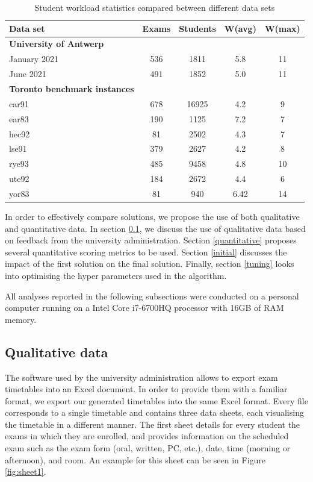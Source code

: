 \begin{table}[H]
	\caption{Student workload statistics compared between different data sets}
	\label{tab:workload_compared}
	\centering
	\begin{tabular}{l c c c c}
		\hline
		\textbf{Data set}& \textbf{Exams} & \textbf{Students} & \textbf{W(avg)} & \textbf{W(max)} \\ \hline
            \textbf{University of Antwerp} \\  \hline
		January 2021  & 536 & 1811 & 5.8 & 11 \\
		June 2021 & 491 & 1852 & 5.0 & 11 \\ \hline
              \textbf{Toronto benchmark instances} \\  \hline
		car91  & 678 & 16925 & 4.2 & 9 \\
		ear83 & 190 & 1125 & 7.2 & 7 \\
            hec92 & 81 & 2502 & 4.3 & 7 \\
            lse91 & 379 & 2627 & 4.2 & 8 \\
            rye93 & 485 & 9458 & 4.8 & 10 \\
            ute92 & 184 & 2672 & 4.4 & 6 \\
            yor83  & 81 & 940 & 6.42 & 14 \\ \hline
	\end{tabular}
\end{table}

In order to effectively compare solutions, we propose the use of both qualitative and quantitative data. In section \ref{qualitative}, we discuss the use of qualitative data based on feedback from the university administration. Section \ref{quantitative} proposes several quantitative scoring metrics to be used. Section \ref{initial} discusses  the impact of the first solution on the final solution. Finally, section \ref{tuning} looks into optimising the hyper parameters used in the algorithm.

All analyses reported in the following subsections were conducted on a personal computer running on a Intel Core i7-6700HQ processor with 16GB of RAM memory.

\subsection{Qualitative data} \label{qualitative}

The software used by the university administration allows to export exam timetables into an Excel document. In order to provide them with a familiar format, we export our generated timetables into the same Excel format. Every file corresponds to a single timetable and contains three data sheets, each visualising the timetable in a different manner. The first sheet details for every student the exams in which they are enrolled, and provides information on the scheduled exam such as the exam form (oral, written, PC, etc.), date, time (morning or afternoon), and room. An example for this sheet can be seen in Figure \ref{fig:sheet1}. 

